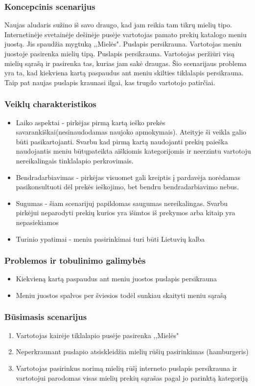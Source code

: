 \documentclass[oneside]{VUMIFPSkursinis}
\begin{document}
		\subsubsection{Koncepcinis scenarijus}
			Naujas aludaris sužino iš savo draugo, kad jam reikia tam tikrų mielių tipo.
			Internetinėje svetainėje dešinėje pusėje vartotojas pamato prekių katalogo meniu juostą.
			Jis spaudžia mygtuką ,,Mielės".
			Puslapis persikrauna.
			Vartotojas meniu juostoje pasirenka mielių tipą.
			Puslapis persikrauna.
			Vartotojas peržiūri visą mielių sąrašą ir pasirenka tas, kurias jam sakė draugas.
			Šio scenarijaus problema yra ta, kad kiekviena kartą paspaudus ant meniu skilties tiklalapis persikrauna.
			Taip pat naujas puslapis kraunasi ilgai, kas trugdo vartotojo patirčiai.
		\subsubsection{Veiklų charakteristikos}
			\begin{itemize}
				\item{Laiko aspektai - pirkėjas pirmą kartą ieško prekės savarankiškai(nesinaudodamas naujoko apmokymais).
					Ateityje ši veikla galio būti pasikartojanti.
					Svarbu kad pirmą kartą naudojanti prekių paieška naudojantis meniu būtųpateikta aiškiomis kategorijomis ir neerzintu vartotoju nereikalingais tinklalapio perkrovimais.}
				\item{Bendradarbiavimas - pirkėjas visuomet gali kreiptis į pardavėja norėdamas pasikonsultuoti dėl prekės ieškojimo, bet bendru bendradarbiavimo nebus.}
				\item{Sugumas - šiam scenarijuj papildomas saugumas nereikalingas.
					Svarbu pirkėjui neparodyti prekių kurios yra išimtos iš prekymos arba kitaip yra nepasiekiamos}
				\item{Turinio ypatimai - meniu pasirinkimai turi būti Lietuvių kalba}
			\end{itemize}
		\subsubsection{Problemos ir tobulinimo galimybės}
			\begin{itemize}
				\item{Kiekvieną kartą paspaudus ant meniu juostos puslapis persikrauna}
				\item{Meniu juostos spalvos per šviesios todėl sunkiau skaityti meniu sąrašą}
			\end{itemize}
		\subsubsection{Būsimasis scenarijus}
			\begin{enumerate}
				\item{Vartotojas kairėje tiklalapio pusėje pasirenka ,,Mielės"}
				\item{Neperkraunant puslapio atsiskleidžia mielių rūšių pasirinkimas (hamburgeris)}
				\item{Vartotojas pasirinkus norimą mielių rūšį interneto puslapis persikrauna ir vartotojui parodomas visas mielių prekių sąrašas pagal jo parinktą kategoriją}
			\end{enumerate}
\end{document}
